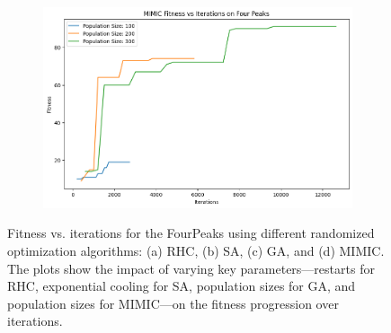 \begin{figure}[htbp]
\begin{subfigure}[b]{0.49\textwidth}
        \caption{}
        \label{fig:fourpeakga}
    \end{subfigure}
    \hfill
    \begin{subfigure}[b]{0.49\textwidth}
        \centering
        \includegraphics[width=\textwidth]{image/fourpeak/mimic.png}
        \caption{}
        \label{fig:fourpeakmimic}
    \end{subfigure}
    \caption{Fitness vs. iterations for the FourPeaks using different randomized optimization algorithms: (a) RHC, (b) SA, (c) GA, and (d) MIMIC. The plots show the impact of varying key parameters—restarts for RHC, exponential cooling for SA, population sizes for GA, and population sizes for MIMIC—on the fitness progression over iterations.}
    \label{fig:fourpeakgrid}
\end{figure}

